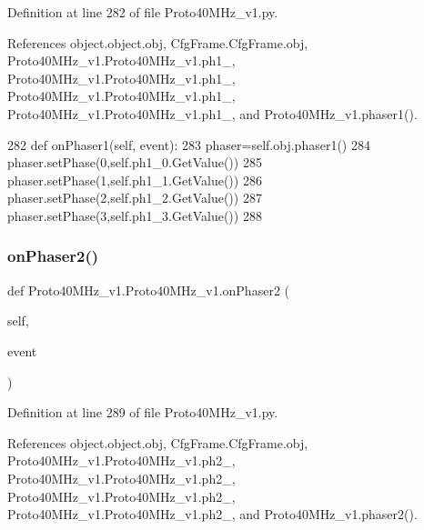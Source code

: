 Definition at line 282 of file Proto40\+M\+Hz\+\_\+v1.\+py.



References object.\+object.\+obj, Cfg\+Frame.\+Cfg\+Frame.\+obj, Proto40\+M\+Hz\+\_\+v1.\+Proto40\+M\+Hz\+\_\+v1.\+ph1\+\_, Proto40\+M\+Hz\+\_\+v1.\+Proto40\+M\+Hz\+\_\+v1.\+ph1\+\_, Proto40\+M\+Hz\+\_\+v1.\+Proto40\+M\+Hz\+\_\+v1.\+ph1\+\_, Proto40\+M\+Hz\+\_\+v1.\+Proto40\+M\+Hz\+\_\+v1.\+ph1\+\_, and Proto40\+M\+Hz\+\_\+v1.\+phaser1().


\begin{DoxyCode}
282     \textcolor{keyword}{def }onPhaser1(self, event):
283         phaser=self.obj.phaser1()
284         phaser.setPhase(0,self.ph1\_0.GetValue())
285         phaser.setPhase(1,self.ph1\_1.GetValue())
286         phaser.setPhase(2,self.ph1\_2.GetValue())
287         phaser.setPhase(3,self.ph1\_3.GetValue())
288 
\end{DoxyCode}
\mbox{\label{classProto40MHz__v1_1_1Proto40MHz__v1_aa6e608163c77fab1034a0d4dd6e07ed3}} 
\subsubsection{\texorpdfstring{on\+Phaser2()}{onPhaser2()}}
{\footnotesize\ttfamily def Proto40\+M\+Hz\+\_\+v1.\+Proto40\+M\+Hz\+\_\+v1.\+on\+Phaser2 (\begin{DoxyParamCaption}\item[{}]{self,  }\item[{}]{event }\end{DoxyParamCaption})}



Definition at line 289 of file Proto40\+M\+Hz\+\_\+v1.\+py.



References object.\+object.\+obj, Cfg\+Frame.\+Cfg\+Frame.\+obj, Proto40\+M\+Hz\+\_\+v1.\+Proto40\+M\+Hz\+\_\+v1.\+ph2\+\_, Proto40\+M\+Hz\+\_\+v1.\+Proto40\+M\+Hz\+\_\+v1.\+ph2\+\_, Proto40\+M\+Hz\+\_\+v1.\+Proto40\+M\+Hz\+\_\+v1.\+ph2\+\_, Proto40\+M\+Hz\+\_\+v1.\+Proto40\+M\+Hz\+\_\+v1.\+ph2\+\_, and Proto40\+M\+Hz\+\_\+v1.\+phaser2().


